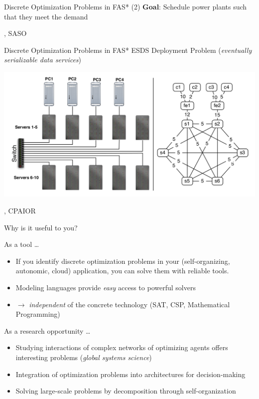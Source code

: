 \begin{frame}[fragile]{Discrete Optimization Problems in FAS* (2)}
\textbf{Goal}: Schedule power plants such that they meet the demand 

\hfill \cite{anders2013trust}, SASO
\end{frame}



\begin{frame}{Discrete Optimization Problems in FAS*}
ESDS Deployment Problem (\emph{eventually serializable data services})

\begin{center}

\includegraphics[width=.7\textwidth]{img/esds.png}
\end{center}
\hfill \cite{michel2008optimal}, CPAIOR
\end{frame}

\begin{frame}{Why is it useful to you?}

\alert{As a tool \ldots }

\begin{itemize}
\item If you identify discrete optimization problems in your (self-organizing, autonomic, cloud) application,
you can solve them with reliable tools.
\item Modeling languages provide \emph{easy} access to powerful solvers
\item $\rightarrow$ \emph{independent} of the concrete technology (SAT, CSP, Mathematical Programming)
\end{itemize}

\vspace*{2ex} \pause 
\alert{As a research opportunity \ldots }
\begin{itemize}
\item Studying interactions of complex networks of optimizing agents offers interesting problems (\emph{global systems science})
\item Integration of optimization problems into architectures for decision-making
\item Solving large-scale problems by decomposition through self-organization
\end{itemize}
\end{frame}



